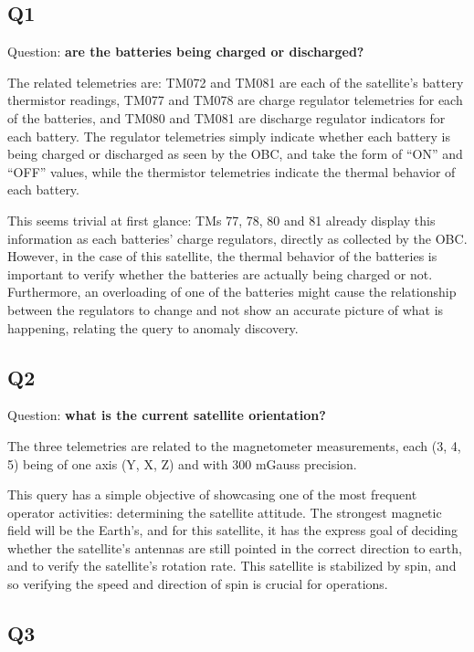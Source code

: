 \subsection{Q1}\label{q1}

Question: \textbf{are the batteries being charged or discharged?}

The related telemetries are: TM072 and TM081 are each of the satellite's battery thermistor readings, TM077 and TM078 are charge regulator telemetries for each of the batteries, and TM080 and TM081 are discharge regulator indicators for each battery.
The regulator telemetries simply indicate whether each battery is being charged or discharged as seen by the OBC, and take the form of ``ON'' and ``OFF'' values, while the thermistor telemetries indicate the thermal behavior of each battery.

This seems trivial at first glance: TMs 77, 78, 80 and 81 already display this information as each batteries' charge regulators, directly as collected by the OBC.
However, in the case of this satellite, the thermal behavior of the batteries is important to verify whether the batteries are actually being charged or not.
Furthermore, an overloading of one of the batteries might cause the relationship between the regulators to change and not show an accurate picture of what is happening, relating the query to anomaly discovery.

\subsection{Q2}\label{q2}

Question: \textbf{what is the current satellite orientation?}

The three telemetries are related to the magnetometer measurements, each (3, 4, 5) being of one axis (Y, X, Z) and with 300 mGauss precision.

This query has a simple objective of showcasing one of the most frequent operator activities: determining the satellite attitude.
The strongest magnetic field will be the Earth's, and for this satellite, it has the express goal of deciding whether the satellite's antennas are still pointed in the correct direction to earth, and to verify the satellite's rotation rate.
This satellite is stabilized by spin, and so verifying the speed and direction of spin is crucial for operations.

\subsection{Q3}\label{q3}


